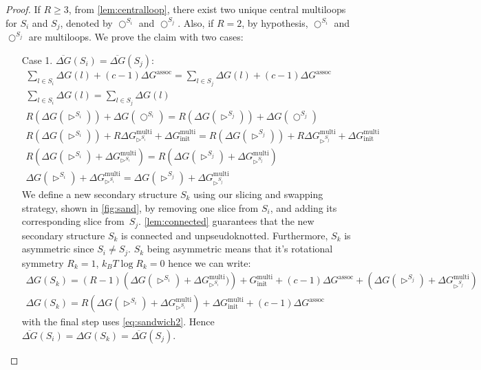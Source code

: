 \documentclass[11pt,letterpaper]{article}  \usepackage[margin=1in]{geometry}
\theoremstyle{definition}  \newtheorem{Definition}[theorem]{Definition}
\newcommand{\DGnosym}{\ensuremath{\overline{\Delta G}}}
\begin{document}
\begin{proof}
	If $R \geq 3$,  from \cref{lem:centralloop},  there exist two unique central multiloops for $S_i$ and $S_j$, denoted  by $\bigcirc^{S_i}$ and $\bigcirc^{S_j}$. Also, if $R=2$, by hypothesis, $\bigcirc^{S_i}$ and $\bigcirc^{S_j}$ are multiloops. 
	We prove the claim with two cases:
	\begin{enumerate}
		\item[Case 1.]  $\DGnosym(S_i) = \DGnosym(S_j)$: 
		\begin{gather}
			\sum_{l\in S_i} \Delta G(l)
			+  (c-1)\Delta G^{\textrm{assoc}} = \sum_{l\in S_j} \Delta G(l)
			+  (c-1)\Delta G^{\textrm{assoc}} \label{eq:sandwich1}
			\\
			\sum_{l\in S_i} \Delta G(l)
			= \sum_{l\in S_j} \Delta G(l)
			\\
			R(\Delta G(\rhd^{S_i}))+ \Delta G(\bigcirc^{S_i})
			= R(\Delta G(\rhd^{S_j}))+ \Delta G(\bigcirc^{S_j})
			\\
			R(\Delta G(\rhd^{S_i})) + R \Delta G_{\rhd^{S_i}}^\textrm{multi} + \Delta G^\textrm{multi}_\textrm{init}
			= 	R(\Delta G(\rhd^{S_j})) + R \Delta G_{\rhd^{S_j}}^\textrm{multi} +  \Delta G^\textrm{multi}_\textrm{init}
			\\
			R(\Delta G(\rhd^{S_i}) + \Delta G_{\rhd^{S_i}}^\textrm{multi} ) = R(\Delta G(\rhd^{S_j}) + \Delta G_{\rhd^{S_j}}^\textrm{multi})
			\\
			\Delta G(\rhd^{S_i}) + \Delta G_{\rhd^{S_i}}^\textrm{multi}  = \Delta G(\rhd^{S_j}) + \Delta G_{\rhd^{S_j}}^\textrm{multi} \label{eq:sandwich2}
		\end{gather}
		We define a new secondary structure $S_k$ using our slicing and swapping strategy, shown in \cref{fig:sand}, by removing one slice from $S_i$, and adding its corresponding slice from~$S_j$. 
		\cref{lem:connected} guarantees that the new secondary structure  $S_k$ is connected and unpseudoknotted. Furthermore,  $S_k$ is asymmetric since $S_i \neq S_j$. 
		$S_k$ being asymmetric means that it's rotational symmetry $R_k=1$, $k_B T \log R_k = 0$ hence we can write: 
		\begin{gather*}
			\Delta G(S_k) = (R-1)\left( \Delta G(\rhd^{S_i}) + \Delta G_{\rhd^{S_i}}^\textrm{multi}) \right) + 
			G^\textrm{multi}_\textrm{init} + (c-1)\Delta G^{\textrm{assoc}} + \left(	\Delta G(\rhd^{S_j}) +\Delta G_{\rhd^{S_j}}^\textrm{multi} \right)
			\\
			\Delta G(S_k) = R\left(\Delta G(\rhd^{S_i}) +  \Delta G_{\rhd^{S_i}}^\textrm{multi} \right) + \Delta G^\textrm{multi}_\textrm{init} + (c-1)\Delta G^{\textrm{assoc}}
		\end{gather*}
		with the final step uses \cref{eq:sandwich2}. 
		Hence  $\DGnosym(S_i) = \Delta G(S_k) = \DGnosym(S_j)$. 
		

\end{enumerate}
\end{proof}
\end{document}
